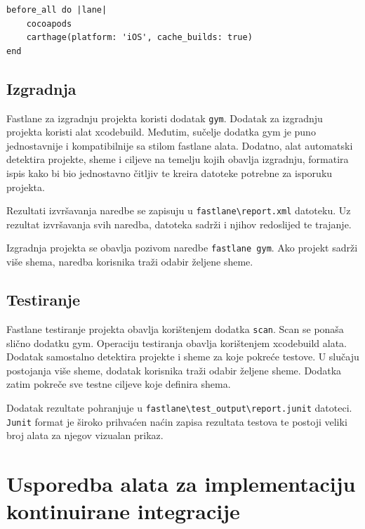 \documentclass[times, utf8, diplomski, numeric]{fer}
\begin{document}
\begin{appendices}
\begin{verbatim}
before_all do |lane|
    cocoapods
    carthage(platform: 'iOS', cache_builds: true)
end
\end{verbatim}

\section{Izgradnja}

Fastlane za izgradnju projekta koristi dodatak \verb|gym|\citep{fastlane:gym}. Dodatak za izgradnju projekta koristi alat xcodebuild. Međutim, sučelje dodatka gym je puno jednostavnije i kompatibilnije sa stilom fastlane alata. Dodatno, alat automatski detektira projekte, sheme i ciljeve na temelju kojih obavlja izgradnju, formatira ispis kako bi bio jednostavno čitljiv te kreira datoteke potrebne za isporuku projekta.

Rezultati izvršavanja naredbe se zapisuju u \verb|fastlane\report.xml| datoteku. Uz rezultat izvršavanja svih naredba, datoteka sadrži i njihov redoslijed te trajanje.

Izgradnja projekta se obavlja pozivom naredbe \verb|fastlane gym|. Ako projekt sadrži više shema, naredba korisnika traži odabir željene sheme.

\section{Testiranje}

Fastlane testiranje projekta obavlja korištenjem dodatka \verb|scan|\citep{fastlane:scan}. Scan se ponaša slično dodatku gym. Operaciju testiranja obavlja korištenjem xcodebuild alata. Dodatak samostalno detektira projekte i sheme za koje pokreće testove. U slučaju postojanja više sheme, dodatak korisnika traži odabir željene sheme. Dodatka zatim pokreče sve testne ciljeve koje definira shema.

Dodatak rezultate pohranjuje u \verb|fastlane\test_output\report.junit| datoteci. \verb|Junit| format je široko prihvaćen naćin zapisa rezultata testova te postoji veliki broj alata za njegov vizualan prikaz.

\chapter{Usporedba alata za implementaciju kontinuirane integracije} \label{header:dodatak_usporedba_alata_za_kontinuiranu_integraciju}

\end{appendices}
\end{document}
